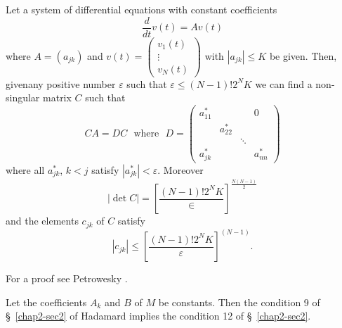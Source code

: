 \setcounter{lemma}{0}
\begin{lemma}[Petrowsky]\label{chap2-sec4-lem1} %
 Let a system of differential equations with constant coefficients 
\begin{equation}
\frac{d}{dt}v(t) = A v(t) \tag{4.8}\label{chap2-eq4.8}
\end{equation}
where $A = (a_{jk})$ and $v(t) = \left(\begin{smallmatrix} v_1 (t)
  \\ \vdots \\ v_N (t) \end{smallmatrix} \right)$ with $|a_{jk}| \leq
K $ be given. Then,  given\pageoriginale any positive number
$\varepsilon $ such that $\varepsilon \leq (N-1) ! 2^N K$ we can find
a non-singular matrix $C$ such that   
\begin{equation}
CA = DC \text{~ where~ } D =
\begin{pmatrix}
a^*_{11} &  & & 0\\ 
 & a^*_{22}  & & \\ 
& & \ddots  & \\ 
a^*_{jk} & & & a^*_{nn} 
 \end{pmatrix}
\tag{4.9}\label{chap2-eq4.9} 
\end{equation}
where all $ a^*_{jk }$, $k < j$  satisfy  $|a^*_{jk}| <
 \varepsilon$. Moreover  
\begin{equation}
| \det C | =\left [\frac{(N-1) ! 2^N K}{\in}
  \right]^{\frac{N(N-1)}{2}}\tag{4.10}\label{chap2-eq4.10}  
\end{equation}
and the elements $c_{jk }$ of $C$ satisfy 
\begin{equation}
|c_{jk}| \leq \left[\frac{(N-1) ! 2^N K }{\varepsilon}
  \right]^{(N-1)}.  \tag{$4.10'$} 
\end{equation} 

For a proof see Petrowesky \cite{key2}.
\end{lemma}

\begin{proposition}\label{chap2-sec4-prop3} %
Let the coefficients $A_k$  and $B$ of $M$ be constants. Then the
condition 9 of \S\ \ref{chap2-sec2} 
of Hadamard implies the condition 12 of \S\ \ref{chap2-sec2}. 
\end{proposition}

